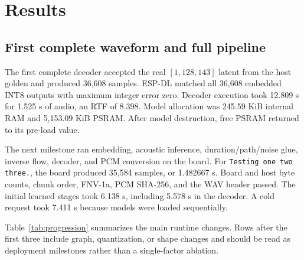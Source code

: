 \documentclass[10pt]{article}
\begin{document}
\section{Results}

\subsection{First complete waveform and full pipeline}

The first complete decoder accepted the real $[1,128,143]$ latent from the
host golden and produced 36,608 samples. ESP-DL matched all 36,608 embedded
INT8 outputs with maximum integer error zero. Decoder execution took 12.809 s
for 1.525 s of audio, an RTF of 8.398. Model allocation was 245.59 KiB internal
RAM and 5,153.09 KiB PSRAM. After model destruction, free PSRAM returned to its
pre-load value.

The next milestone ran embedding, acoustic inference, duration/path/noise
glue, inverse flow, decoder, and PCM conversion on the board. For
\texttt{Testing one two three.}, the board produced 35,584 samples, or
1.482667 s. Board and host byte counts, chunk order, FNV-1a, PCM SHA-256, and
the WAV header passed. The initial learned stages took 6.138 s, including
5.578 s in the decoder. A cold request took 7.411 s because models were loaded
sequentially.

Table~\ref{tab:progression} summarizes the main runtime changes. Rows after
the first three include graph, quantization, or shape changes and should be
read as deployment milestones rather than a single-factor ablation.
\end{document}

